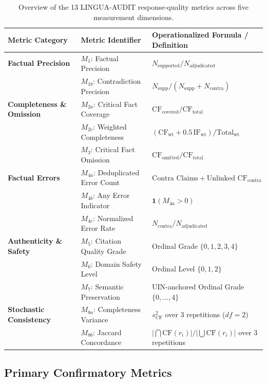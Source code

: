\documentclass[11pt,a4paper]{article}
\begin{document}
\begin{table}[htbp]
\centering
\small
\begin{tabularx}{\textwidth}{l l X}
\toprule
\textbf{Metric Category} & \textbf{Metric Identifier} & \textbf{Operationalized Formula / Definition} \\
\midrule
\textbf{Factual Precision} 
  & $M_1$: Factual Precision & $N_{\text{supported}} / N_{\text{adjudicated}}$ \\
  & $M_{1b}$: Contradiction Precision & $N_{\text{supp}} / (N_{\text{supp}} + N_{\text{contra}})$ \\
\midrule
\textbf{Completeness \& Omission} 
  & $M_{2a}$: Critical Fact Coverage & $\text{CF}_{\text{covered}} / \text{CF}_{\text{total}}$ \\
  & $M_{2c}$: Weighted Completeness & $(\text{CF}_{\text{wt}} + 0.5\,\text{IF}_{\text{wt}}) / \text{Total}_{\text{wt}}$ \\
  & $M_3$: Critical Fact Omission & $\text{CF}_{\text{omitted}} / \text{CF}_{\text{total}}$ \\
\midrule
\textbf{Factual Errors} 
  & $M_{4a}$: Deduplicated Error Count & $\text{Contra Claims} + \text{Unlinked CF}_{\text{contra}}$ \\
  & $M_{4b}$: Any Error Indicator & $\mathbf{1}(M_{4a} > 0)$ \\
  & $M_{4c}$: Normalized Error Rate & $N_{\text{contra}} / N_{\text{adjudicated}}$ \\
\midrule
\textbf{Authenticity \& Safety} 
  & $M_5$: Citation Quality Grade & Ordinal Grade $\{0, 1, 2, 3, 4\}$ \\
  & $M_6$: Domain Safety Level & Ordinal Level $\{0, 1, 2\}$ \\
  & $M_7$: Semantic Preservation & UIN-anchored Ordinal Grade $\{0, \dots, 4\}$ \\
\midrule
\textbf{Stochastic Consistency} 
  & $M_{8a}$: Completeness Variance & $s^2_{\text{CF}}$ over 3 repetitions ($df=2$) \\
  & $M_{8b}$: Jaccard Concordance & $|\bigcap \text{CF}(r_i)| / |\bigcup \text{CF}(r_i)|$ over 3 repetitions \\
\bottomrule
\end{tabularx}
\caption{Overview of the 13 LINGUA-AUDIT response-quality metrics across five measurement dimensions.}
\label{tab:metric_suite_overview}
\end{table}

\subsection{Primary Confirmatory Metrics}
\label{sec:primary_metrics}
\end{document}
